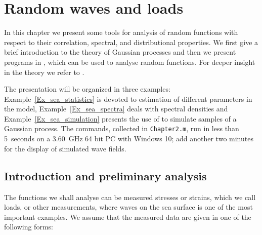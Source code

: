 %
\chapter{Random waves and loads}
\label{cha:rand-loads-stoch}\label{cha:2}

In this chapter we present some tools for analysis of random functions
with respect to their correlation, spectral, and distributional
properties. We first give a brief introduction to the theory of Gaussian
processes and then we present programs in \progname{},
which can be used to analyse random functions. For deeper insight in the theory 
we refer to \cite{Lindgren2013,LindgrenRootzenSandsten2014}.

The presentation will be organized in three examples:
Example~\ref{Ex_sea_statistics}
is devoted to estimation of different parameters in the model,
Example~\ref{Ex_sea_spectra}
deals with spectral densities and
Example~\ref{Ex_sea_simulation}
presents the use of \progname{} to simulate samples of a Gaussian process.
The commands, collected in \verb+Chapter2.m+, run in less than
5~seconds on a 3.60~GHz 64 bit PC with Windows 10; add another two minutes 
for the display of simulated wave fields.

\section{Introduction and preliminary analysis}
\label{sec:intr-prel-analys}\label{sect2.1}
The functions we shall analyse can be measured stresses or strains,
which we call loads, or other measurements, where waves on the sea
surface is one of the most important examples.
We assume that the measured data are given in one of the following  forms:

